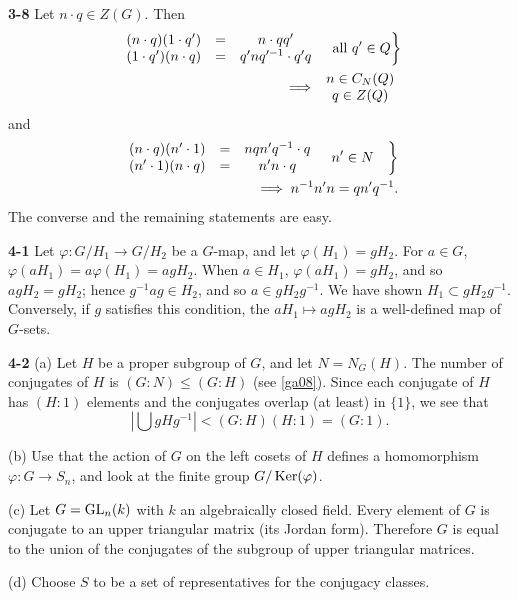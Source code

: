 \documentclass[a4paper,11pt,final,openany]{memoir}%
\theoremstyle{nonumberplain}
\begin{document}
\bigskip\noindent\textbf{3-8}
Let $n\cdot q\in Z(G)$. Then%
\begin{align*}
\left.
\begin{array}
[c]{ccc}%
(n\cdot q)(1\cdot q^{\prime}) & = & n\cdot qq^{\prime}\\
(1\cdot q^{\prime})(n\cdot q) & = & q^{\prime}nq^{\prime-1}\cdot q^{\prime}q
\end{array}
\quad\text{all }q^{\prime}\in Q\right\} \\
 \implies%
\begin{array}
[c]{c}%
n\in C_{N}(Q)\\
q\in Z(Q)
\end{array}
\end{align*}
and%
\begin{align*}
\left.
\begin{array}
[c]{ccc}%
(n\cdot q)(n^{\prime}\cdot1) & = & nqn^{\prime}q^{-1}\cdot q\\
(n^{\prime}\cdot1)(n\cdot q) & = & n^{\prime}n\cdot q
\end{array}
\quad n^{\prime}\in N\quad\right\} \\
 \implies n^{-1}n^{\prime}n=qn^{\prime
}q^{-1}.
\end{align*}
The converse and the remaining statements are easy.

\bigskip\noindent\textbf{4-1}
Let $\varphi\colon G/H_{1}\rightarrow G/H_{2}$ be a $G$-map, and let
$\varphi(H_{1})=gH_{2}$. For $a\in G$, $\varphi(aH_{1})=a\varphi
(H_{1})=agH_{2}$. When $a\in H_{1}$, $\varphi(aH_{1})=gH_{2}$, and so
$agH_{2}=gH_{2}$; hence $g^{-1}ag\in H_{2}$, and so $a\in gH_{2}g^{-1}$. We
have shown $H_{1}\subset gH_{2}g^{-1}$. Conversely, if $g$ satisfies this
condition, the $aH_{1}\mapsto agH_{2}$ is a well-defined map of $G$-sets.

\bigskip\noindent\textbf{4-2}
(a) Let $H$ be a proper subgroup of $G$, and let $N=N_{G}(H)$. The number of
conjugates of $H$ is $(G:N)\leq(G:H)$ (see \ref{ga08}). Since each conjugate
of $H$ has $(H:1)$ elements and the conjugates overlap (at least) in $\{1\}$,
we see that
\[
\left\vert \bigcup gHg^{-1}\right\vert <(G:H)(H:1)=(G:1).
\]\par
(b) Use that the action of  $G$ on the left cosets of $H$ defines a homomorphism $\varphi\colon G\to S_n$, and
look at the finite group $G/\operatorname{Ker}(\varphi)$.\par
(c)  Let $G=\operatorname{GL}_n(k)$
with $k$ an algebraically closed field. Every element of $G$
is conjugate to an upper triangular matrix (its Jordan form). Therefore
$G$ is equal to the union of the conjugates of the subgroup of upper triangular matrices.\par
(d) Choose $S$ to be a set of representatives for the
conjugacy classes.
\end{document}
